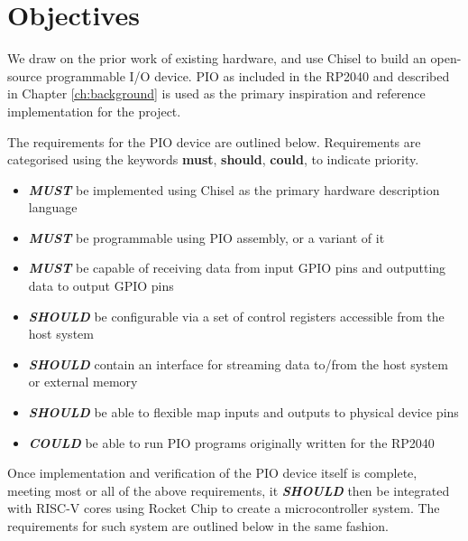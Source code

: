 \chapter{Objectives}
\label{ch:objectives}

We draw on the prior work of existing hardware, and use Chisel to build an open-source programmable I/O device. PIO as included in the RP2040 and described in Chapter \ref{ch:background} is used as the primary inspiration and reference implementation for the project.

The requirements for the PIO device are outlined below. Requirements are categorised using the keywords \textbf{must}, \textbf{should}, \textbf{could}, to indicate priority.

\begin{itemize}
    \item \textit{\textbf{MUST}} be implemented using Chisel as the primary hardware description language
    \item \textit{\textbf{MUST}} be programmable using PIO assembly, or a variant of it
    \item \textit{\textbf{MUST}} be capable of receiving data from input GPIO pins and outputting data to output GPIO pins
    \item \textit{\textbf{SHOULD}} be configurable via a set of control registers accessible from the host system
    \item \textit{\textbf{SHOULD}} contain an interface for streaming data to/from the host system or external memory
    \item \textit{\textbf{SHOULD}} be able to flexible map inputs and outputs to physical device pins
    \item \textit{\textbf{COULD}} be able to run PIO programs originally written for the RP2040
\end{itemize}

Once implementation and verification of the PIO device itself is complete, meeting most or all of the above requirements, it \textit{\textbf{SHOULD}} then be integrated with RISC-V cores using Rocket Chip to create a microcontroller system. The requirements for such system are outlined below in the same fashion.

